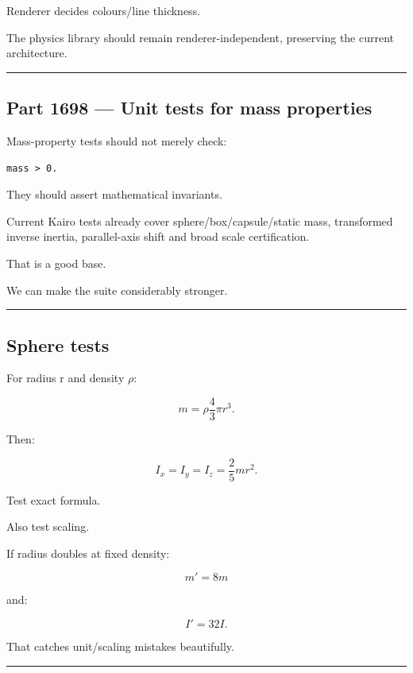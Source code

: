 Renderer decides colours/line thickness.

The physics library should remain renderer-independent, preserving the current architecture.

\begin{center}\rule{0.5\linewidth}{0.5pt}\end{center}

\subsection{Part 1698 --- Unit tests for mass properties}\label{06-engine-ii-ch039-part-1698-unit-tests-for-mass-properties}

Mass-property tests should not merely check:

\begin{verbatim}
mass > 0.
\end{verbatim}

They should assert mathematical invariants.

Current Kairo tests already cover sphere/box/capsule/static mass, transformed inverse inertia, parallel-axis shift and broad scale certification.

That is a good base.

We can make the suite considerably stronger.

\begin{center}\rule{0.5\linewidth}{0.5pt}\end{center}

\subsection{Sphere tests}\label{06-engine-ii-ch039-sphere-tests}

For radius r and density \(\rho\):

\[
m
=
\rho
\frac43\pi r^3.
\]

Then:

\[
I_x=I_y=I_z
=
\frac25mr^2.
\]

Test exact formula.

Also test scaling.

If radius doubles at fixed density:

\[
m'=
8m
\]

and:

\[
I'=
32I.
\]

That catches unit/scaling mistakes beautifully.

\begin{center}\rule{0.5\linewidth}{0.5pt}\end{center}

